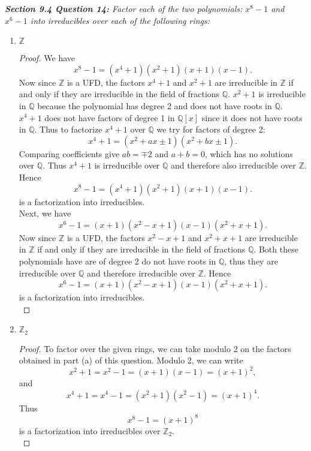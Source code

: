 \documentclass{article}
\begin{document}
\it \textbf{Section 9.4 Question 14:} Factor each of the two polynomials:
  $x^8-1$ and $x^6-1$ into irreducibles over each of the following rings:
  \begin{enumerate}[label={(\alph*)}]
    \item $\mathbb{Z}$
      \begin{proof}
        We have
        \[x^8-1 =(x^4+1)(x^2+1)(x+1)(x-1).\]
        Now since $\mathbb{Z}$ is a UFD, the factors $x^4+1$ and $x^2+1$
        are irreducible in $\mathbb{Z}$ if and only if they are irreducible
        in the field of fractions $\mathbb{Q}$. $x^2+1$ is irreducible in
        $\mathbb{Q}$ because the polynomial has degree 2 and does not have
        roots in $\mathbb{Q}$. $x^4+1$ does not have factors of degree 1 in
        $\mathbb{Q}[x]$ since it does not have roots in $\mathbb{Q}$. Thus
        to factorize $x^4+1$ over $\mathbb{Q}$ we try for factors of degree
        2:
        \[x^4+1=(x^2+ax\pm1)(x^2+bx\pm1).\]
        Comparing coefficients give $ab=\mp2$ and $a+b=0$, which has no
        solutions over $\mathbb{Q}$. Thus $x^4+1$ is irreducible over
        $\mathbb{Q}$ and therefore also irreducible over $\mathbb{Z}$.
        Hence
        \[x^8-1 =(x^4+1)(x^2+1)(x+1)(x-1).\]
        is a factorization into irreducibles. \\

        Next, we have
        \[x^6-1 =(x+1)(x^2-x+1)(x-1)(x^2+x+1).\]
        Now since $\mathbb{Z}$ is a UFD, the factors $x^2-x+1$ and $x^2+x+1$
        are irreducible in $\mathbb{Z}$ if and only if they are irreducible
        in the field of fractions $\mathbb{Q}$. Both these polynomials have
        are of degree 2 do not have roots in $\mathbb{Q}$, thus they are
        irreducible over $\mathbb{Q}$ and therefore irreducible over
        $\mathbb{Z}$. Hence
        \[x^6-1 =(x+1)(x^2-x+1)(x-1)(x^2+x+1).\]
        is a factorization into irreducibles. \\
      \end{proof}

    \item $\mathbb{Z}_2$
      \begin{proof}
        To factor over the given rings, we can take modulo 2 on the factors
        obtained in part (a) of this question. Modulo 2, we can write
        \[x^2+1= x^2-1= (x+1)(x-1)= (x+1)^2,\]
        and
        \[x^4+1= x^4-1= (x^2+1)(x^2-1)= (x+1)^4.\]
        Thus
        \[x^8-1 =(x+1)^8\]
        is a factorization into irreducibles over $\mathbb{Z}_2$. \\


\end{proof}
\end{enumerate}
\end{document}
